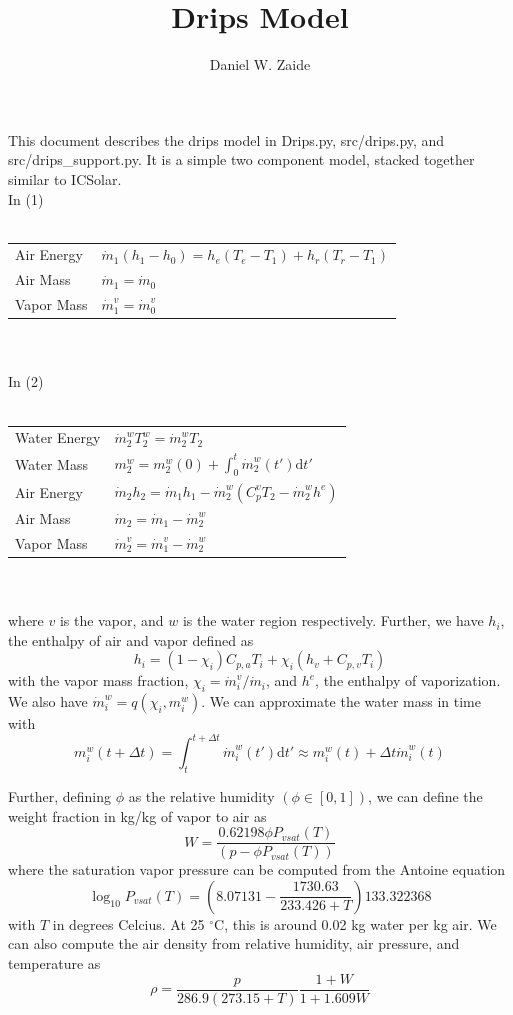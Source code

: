 \documentclass[11pt]{article}
\title{Drips Model}
\author{Daniel W. Zaide}
\begin{document}
\maketitle
This document describes the drips model in Drips.py, src/drips.py, and src/drips\_support.py. It is a simple two component model, stacked together similar to ICSolar.\\
\noindent In (1)\\\\
\begin{tabular}{l|l}
Air Energy & $\dot{m}_1(h_1-h_0) = h_e (T_e-T_1) + h_r(T_r-T_1)$ \\
Air Mass & $\dot{m}_1 = \dot{m}_0$ \\
Vapor Mass & $\dot{m}^v_1 = \dot{m}^v_0$
\end{tabular}\\\\
In (2)\\\\
\begin{tabular}{l|l}
Water Energy & $\dot{m}_2^w T_2^w =  \dot{m}_2^wT_2$\\
Water Mass & $m_2^w = m_2^w(0) + \displaystyle \int_0^t \dot{m}_2^w(t')\mathrm{d}t'$ \\
Air Energy & $\dot{m}_{2}h_{2} = \dot{m}_{1}h_{1} - \dot{m}_{2}^w(C_{p}^vT_{2}-\dot{m}_2^wh^e)$\\
Air Mass & $\dot{m}_2 = \dot{m}_1 - \dot{m}_2^w$ \\
Vapor Mass & $\dot{m}_2^v = \dot{m}_1^v - \dot{m}_2^w$
\end{tabular} \\\\

where $v$ is the vapor, and $w$ is the water region respectively. Further, we have $h_{i}$, the enthalpy of air and vapor defined as
\begin{equation}
h_{i} = (1-\chi_i)C_{p,a}T_{i} + \chi_i(h_v+C_{p,v}T_{i})
\end{equation}
with the vapor mass fraction, $\chi_i = \dot{m}^v_i/\dot{m}_i$, and $h^e$, the enthalpy of vaporization. We also have $\dot{m}_i^w = q(\chi_i,m_i^w)$. We can approximate the water mass in time with 
\[
m_i^w(t+\Delta t) = \displaystyle\int_t^{t+\Delta t} \dot{m}_i^w(t')\mathrm{d}t' \approx m_i^w(t) + \Delta t \dot{m}^w_i(t)
\]

Further, defining $\phi$ as the relative humidity $(\phi \in [0,1])$, we can define the weight fraction in kg/kg of vapor to air as
\[
W = \frac{0.62198 \phi P_{vsat}(T)}{(p-\phi P_{vsat}(T))}
\]
where the saturation vapor pressure can be computed from the Antoine equation
\[
\log_{10}P_{vsat}(T) = \left(8.07131-\frac{1730.63}{233.426+T}\right)133.322368
\]
with $T$ in degrees Celcius. At 25 $^{\circ}$C, this is around 0.02 kg water per kg air. We can also compute the air density from relative humidity, air pressure, and temperature as 
\[
\rho = \frac{p}{286.9(273.15+T)}\frac{1+W}{1+1.609W}
\]
\end{document}
